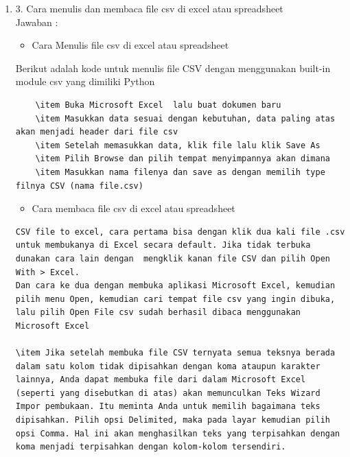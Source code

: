 \begin{enumerate}
\item 3. Cara menulis dan membaca file csv di excel atau spreadsheet\\
Jawaban :

\begin{itemize}
\item Cara Menulis file csv di excel atau spreadsheet
\end{itemize}
Berikut adalah kode untuk menulis file CSV dengan menggunakan built-in module csv yang dimiliki Python

\begin{verbatim}
	\item Buka Microsoft Excel  lalu buat dokumen baru
	\item Masukkan data sesuai dengan kebutuhan, data paling atas akan menjadi header dari file csv
	\item Setelah memasukkan data, klik file lalu klik Save As
	\item Pilih Browse dan pilih tempat menyimpannya akan dimana
	\item Masukkan nama filenya dan save as dengan memilih type filnya CSV (nama file.csv)
\end{verbatim}

\begin{itemize}
\item Cara membaca file csv di excel atau spreadsheet
\end{itemize}

\begin{verbatim}
CSV file to excel, cara pertama bisa dengan klik dua kali file .csv untuk membukanya di Excel secara default. Jika tidak terbuka dunakan cara lain dengan  mengklik kanan file CSV dan pilih Open With > Excel. 
Dan cara ke dua dengan membuka aplikasi Microsoft Excel, kemudian pilih menu Open, kemudian cari tempat file csv yang ingin dibuka, lalu pilih Open File csv sudah berhasil dibaca menggunakan Microsoft Excel

\item Jika setelah membuka file CSV ternyata semua teksnya berada dalam satu kolom tidak dipisahkan dengan koma ataupun karakter lainnya, Anda dapat membuka file dari dalam Microsoft Excel (seperti yang disebutkan di atas) akan memunculkan Teks Wizard Impor pembukaan. Itu meminta Anda untuk memilih bagaimana teks dipisahkan. Pilih opsi Delimited, maka pada layar kemudian pilih opsi Comma. Hal ini akan menghasilkan teks yang terpisahkan dengan koma menjadi terpisahkan dengan kolom-kolom tersendiri.
\end{verbatim}


\end{enumerate}
